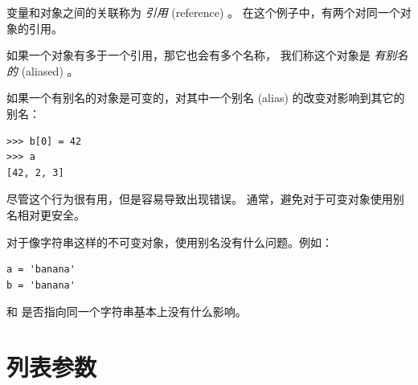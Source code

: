 变量和对象之间的关联称为 {\em 引用} (reference) 。
在这个例子中，有两个对同一个对象的引用。



如果一个对象有多于一个引用，那它也会有多个名称，
我们称这个对象是 {\em 有别名的} (aliased) 。



如果一个有别名的对象是可变的，对其中一个别名 (alias) 的改变对影响到其它的别名：

\begin{lstlisting}
>>> b[0] = 42
>>> a
[42, 2, 3]
\end{lstlisting}

%

尽管这个行为很有用，但是容易导致出现错误。
通常，避免对于可变对象使用别名相对更安全。



对于像字符串这样的不可变对象，使用别名没有什么问题。例如：

\begin{lstlisting}
a = 'banana'
b = 'banana'
\end{lstlisting}

%

 和  是否指向同一个字符串基本上没有什么影响。


\section{列表参数}
\label{list.arguments}
  
  


